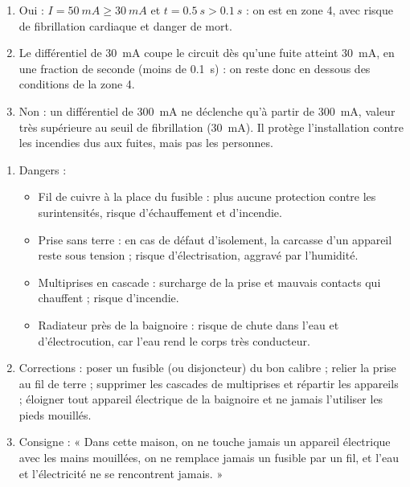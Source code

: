 \documentclass[11pt]{article}
\begin{document}
\begin{corrige}
\begin{enumerate}
\item Oui : $I = \SI{50}{mA} \ge \SI{30}{mA}$ et $t = \SI{0,5}{s} > \SI{0,1}{s}$ : on est en zone 4, avec risque de fibrillation cardiaque et danger de mort.
\item Le différentiel de \SI{30}{mA} coupe le circuit dès qu'une fuite atteint \SI{30}{mA}, en une fraction de seconde (moins de \SI{0,1}{s}) : on reste donc en dessous des conditions de la zone 4.
\item Non : un différentiel de \SI{300}{mA} ne déclenche qu'à partir de \SI{300}{mA}, valeur très supérieure au seuil de fibrillation (\SI{30}{mA}). Il protège l'installation contre les incendies dus aux fuites, mais pas les personnes.
\end{enumerate}
\end{corrige}

\begin{corrige}
\begin{enumerate}
\item Dangers :
\begin{itemize}
\item Fil de cuivre à la place du fusible : plus aucune protection contre les surintensités, risque d'échauffement et d'incendie.
\item Prise sans terre : en cas de défaut d'isolement, la carcasse d'un appareil reste sous tension ; risque d'électrisation, aggravé par l'humidité.
\item Multiprises en cascade : surcharge de la prise et mauvais contacts qui chauffent ; risque d'incendie.
\item Radiateur près de la baignoire : risque de chute dans l'eau et d'électrocution, car l'eau rend le corps très conducteur.
\end{itemize}
\item Corrections : poser un fusible (ou disjoncteur) du bon calibre ; relier la prise au fil de terre ; supprimer les cascades de multiprises et répartir les appareils ; éloigner tout appareil électrique de la baignoire et ne jamais l'utiliser les pieds mouillés.
\item Consigne : « Dans cette maison, on ne touche jamais un appareil électrique avec les mains mouillées, on ne remplace jamais un fusible par un fil, et l'eau et l'électricité ne se rencontrent jamais. »
\end{enumerate}
\end{corrige}
\end{document}

